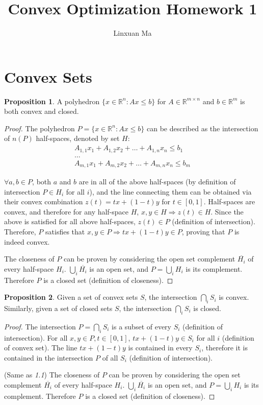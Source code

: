 \documentclass[12pt]{article}
\title{\vspace{-2.0cm}Convex Optimization Homework 1}
\author{Linxuan Ma}
\newcommand{\RR}{\mathbb{R}}
\theoremstyle{definition}
\newtheorem{prop}{Proposition}[section]
\begin{document}
	\maketitle
	
	\section{Convex Sets}
	
	\begin{prop}
		A polyhedron $\{x \in \RR^n : Ax \leq b\}$ for $A \in \RR^{m \times n}$ and $b \in \RR^m$ is both convex and closed.
	\end{prop}
	\begin{proof}
		The polyhedron $P = \{x \in \RR^n : Ax \leq b\}$ can be described as the intersection of $n(P)$ half-spaces, denoted by set $H$:
		\begin{gather*}
			A_{1,1}x_1 + A_{1,2}x_2 + \dots + A_{1,n}x_n \leq  b_1 \\
			\dots \\
			A_{m,1}x_1 + A_{m,2}x_2 + \dots + A_{m,n}x_n \leq  b_m
		\end{gather*}
		
		$\forall a, b \in P$, both $a$ and $b$ are in all of the above half-spaces (by definition of intersection $P \in H_i$ for all $i$), and the line connecting them can be obtained via their convex combination $z(t) = tx + (1-t)y$ for $t \in [0, 1]$. Half-spaces are convex, and therefore for any half-space $H$, $x, y \in H \Rightarrow z(t) \in H$. Since the above is satisfied for all above half-spaces,  $z(t) \in P$ (definition of intersection). Therefore, $P$ satisfies that $x, y \in P \Rightarrow tx + (1-t)y \in P$, proving that $P$ is indeed convex.
		
		The closeness of $P$ can be proven by considering the open set complement $\overline{H_i}$ of every half-space $H_i$. $\bigcup_i \overline{H_i}$ is an open set, and $P = \bigcup_i H_i$ is its complement. Therefore $P$ is a closed set (definition of closeness).
	\end{proof}
	
	\begin{prop}
		Given a set of convex sets $S$, the intersection $\bigcap_i S_i$ is convex. Similarly, given a set of closed sets $S$, the intersection $\bigcap_i S_i$ is closed.
	\end{prop}
	
	\begin{proof}
		The intersection $P = \bigcap_i S_i$ is a subset of every $S_i$ (definition of intersection). For all $x, y \in P, t \in [0, 1]$, $tx + (1-t)y \in S_i$ for all $i$ (definition of convex set). The line $tx + (1-t)y$ is contained in every $S_i$, therefore it is contained in the intersection $P$ of all $S_i$ (definition of intersection).
		
		(Same as \textit{1.1}) The closeness of $P$ can be proven by considering the open set complement $\overline{H_i}$ of every half-space $H_i$. $\bigcup_i \overline{H_i}$ is an open set, and $P = \bigcup_i H_i$ is its complement. Therefore $P$ is a closed set (definition of closeness).
	\end{proof}
	
\end{document}
